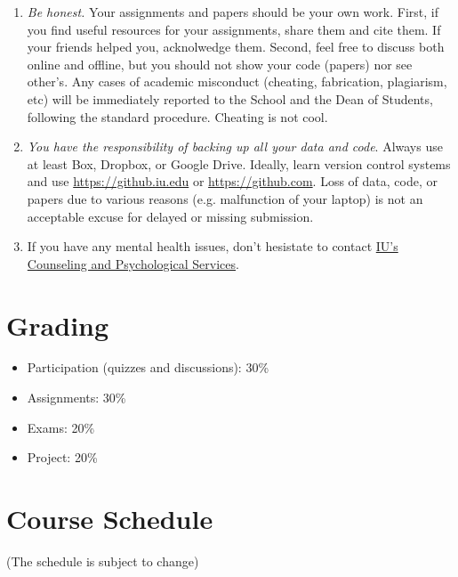 \documentclass[11pt,article,oneside]{memoir}
\begin{document}
\begin{enumerate}
\item \emph{Be honest.} Your assignments and papers should be your own work.
First, if you find useful resources for your assignments, share them and cite
them. If your friends helped you, acknolwedge them. Second, feel free to
discuss both online and offline, but you should not show your code (papers) nor
see other's. Any cases of academic misconduct (cheating, fabrication,
plagiarism, etc) will be immediately reported to the School and the Dean of
Students, following the standard procedure. Cheating is not cool. 

\item \emph{You have the responsibility of backing up all your data and code}.
Always use at least Box, Dropbox, or Google Drive. Ideally, learn version
control systems and use \url{https://github.iu.edu} or
\url{https://github.com}. Loss of data, code, or papers due to various reasons
(e.g. malfunction of your laptop) is not an acceptable excuse for delayed or
missing submission. 

\item If you have any mental health issues, don't hesistate to contact
\href{http://jhealthcenter.indiana.edu/counseling/index.shtml}{IU's Counseling
and Psychological Services}. 


\end{enumerate}

\section{Grading}
\label{sec:grading_tentative_}

\begin{itemize}

\item Participation (quizzes and discussions): 30\%

\item Assignments: 30\%

\item Exams: 20\%

\item Project: 20\%


\end{itemize}

\section{Course Schedule}

(The schedule is subject to change)
\end{document}
